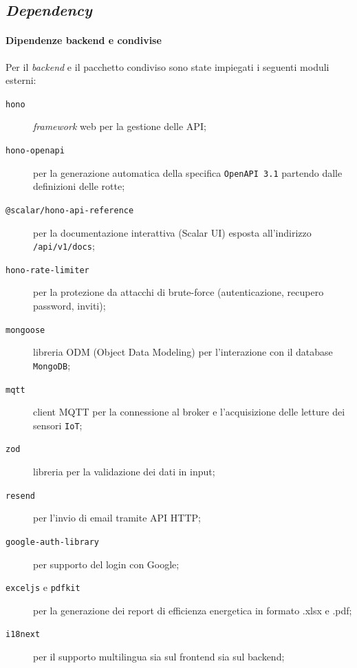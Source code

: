 \subsection{\textit{Dependency}}
    \paragraph{Dipendenze backend e condivise} Per il \textit{backend} e il pacchetto condiviso sono state impiegati i seguenti moduli esterni:
    \begin{description}
        \item[\texttt{hono}] \textit{framework} web per la gestione delle API;
        \item[\texttt{hono-openapi}] per la generazione automatica della specifica \texttt{OpenAPI 3.1} partendo dalle definizioni delle rotte;
        \item[\texttt{@scalar/hono-api-reference}] per la documentazione interattiva (Scalar UI) esposta all'indirizzo \texttt{/api/v1/docs};
        \item[\texttt{hono-rate-limiter}] per la protezione da attacchi di brute-force (autenticazione, recupero password, inviti);
        \item[\texttt{mongoose}] libreria ODM (Object Data Modeling) per l'interazione con il database \texttt{MongoDB};
        \item[\texttt{mqtt}] client MQTT per la connessione al broker e l'acquisizione delle letture dei sensori \texttt{IoT};
        \item[\texttt{zod}] libreria per la validazione dei dati in input;
        \item[\texttt{resend}] per l'invio di email tramite API HTTP;
        \item[\texttt{google-auth-library}] per supporto del login con Google;
        \item[\texttt{exceljs} e \texttt{pdfkit}] per la generazione dei report di efficienza energetica in formato .xlsx e .pdf;
        \item[\texttt{i18next}] per il supporto multilingua sia sul frontend sia sul backend;
    \end{description}
